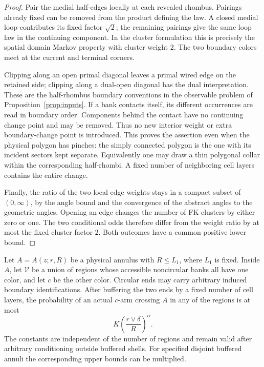 \begin{proof}
Pair the medial half-edges locally at each revealed rhombus. Pairings
already fixed can be removed from the product defining the law.
A closed medial loop contributes its fixed factor \(\sqrt2\);
the remaining pairings give the same loop law in the continuing
component. In the cluster formulation this is precisely the spatial
domain Markov property with cluster weight \(2\). The two boundary
colors meet at the current and terminal corners.

Clipping along an open primal diagonal leaves a primal wired edge on
the retained side; clipping along a dual-open diagonal has the dual
interpretation. These are the half-rhombus boundary conventions in the
observable problem of Proposition~\ref{prop:inputs}. If a bank contacts
itself, its different occurrences are read in boundary order. Components
behind the contact have no continuing change point and may be removed.
Thus no new interior weight or extra boundary-change point is introduced.
This proves the assertion even when the physical polygon has pinches:
the simply connected polygon is the one with its incident sectors kept
separate. Equivalently one may draw a thin polygonal collar within the
corresponding half-rhombi. A fixed number of neighboring cell layers
contains the entire change.

Finally, the ratio of the two local edge weights stays in a compact
subset of \((0,\infty)\), by the angle bound and the convergence of
the abstract angles to the geometric angles. Opening an edge changes
the number of FK clusters by either zero or one. The two conditional
odds therefore differ from the weight ratio by at most the fixed
cluster factor \(2\). Both outcomes have a common positive lower bound.
\end{proof}

\begin{lemma}
\label{geo:arm}
Let \(A=A(z;r,R)\) be a physical annulus with \(R\le L_1\), where \(L_1\)
is fixed. Inside \(A\), let \(\mathcal V\) be a union of regions whose
accessible noncircular banks all have one color, and let \(c\) be the
other color. Circular ends may carry arbitrary induced boundary
identifications. After buffering the two ends by a fixed number of
cell layers, the probability of an actual \(c\)-arm crossing \(A\)
in any of the regions is at most
\begin{equation}
 K\left(\frac{r\vee\delta}{R}\right)^\alpha.
 \label{geo:arm-bound}
\end{equation}
The constants are independent of the number of regions and remain
valid after arbitrary conditioning outside buffered shells. For
specified disjoint buffered annuli the corresponding upper bounds
can be multiplied.
\end{lemma}

